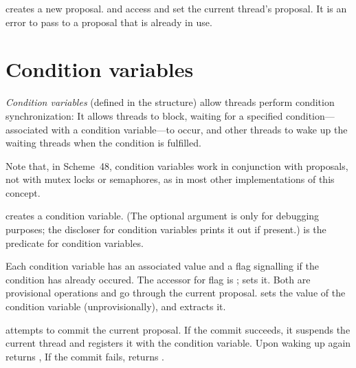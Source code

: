  creates a new proposal.
 and  access and set
 the current thread's proposal.
It is an error to pass to  a proposal that
 is already in use.


\section{Condition variables}

\textit{Condition variables} (defined in the 
structure) allow threads perform condition synchronization: It allows
threads to block, waiting for a specified condition---associated with a
condition variable---to occur, and other threads to wake up the waiting
threads when the condition is fulfilled.

Note that, in Scheme~48, condition variables work in conjunction with
proposals, not with mutex locks or semaphores, as in most other
implementations of this concept.

\begin{protos}
\end{protos}
%
 creates a condition variable.  (The optional
 argument is only for debugging purposes; the discloser for
condition variables prints it out if present.)   is the
predicate for condition variables.

Each condition variable has an associated value and a flag
 signalling if the condition has already occured.
The accessor for flag is ;
 sets it.  Both are provisional
operations and go through the current proposal.
 sets the value of the condition variable
(unprovisionally), and  extracts it.

 attempts to commit the
current proposal.  If the commit succeeds, it suspends the current
thread and registers it with the  condition variable.
Upon waking up again  returns
, If the commit fails, 
returns .

